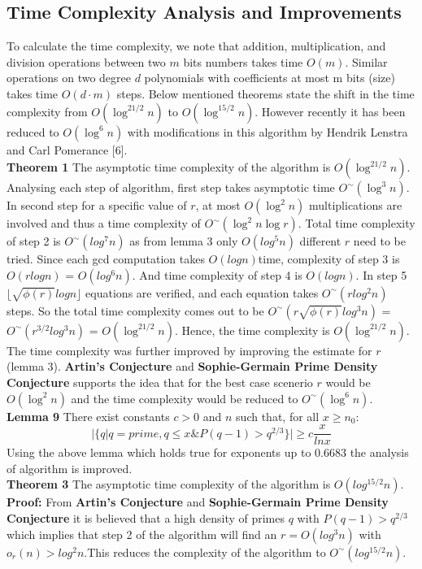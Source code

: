 \documentclass[10pt]{article}
\begin{document}
\subsection*{Time Complexity Analysis and Improvements}
To calculate the time complexity, we note that addition, multiplication, and division operations between two $m$ bits numbers takes time $O(m)$. Similar operations on two degree $d$ polynomials with coefficients at most m bits (size) takes time $O(d·m)$ steps. Below mentioned theorems state the shift in the time complexity from $O(\log^{21/2}n)$ to $O(\log^{15/2}n)$. However recently it has been reduced to $O(\log^6 n)$ with  modifications in this algorithm by Hendrik Lenstra and Carl Pomerance [6].\\
\textbf{Theorem 1} The asymptotic time complexity of the algorithm is $O(\log^{21/2} n)$.\\
Analysing each step of algorithm, first step takes asymptotic time $O^\sim(\log^3 n)$. In second step for a specific value of $r$, at most $O(\log^2 n)$ multiplications are involved and thus a time complexity of $O^{\sim}(\log^2 n \log r)$. Total time complexity of step 2 is $O^{\sim}(log^7 n)$ as from lemma 3 only $O(log^5 n)$ different $r$ need to be tried. Since each gcd computation takes $O(log n)$time, complexity of step 3 is $O(r log n)$ = $O(log^6 n)$. And time complexity of step 4 is $O(log n)$. In step 5 $\lfloor \sqrt{\phi(r)} log n \rfloor$ equations are verified, and each equation takes $O^{\sim}(r log^{2} n)$ steps. So the total time complexity comes out to be $O^{\sim}(r \sqrt{\phi(r)} log^3 n)$ = $O^{\sim}(r^{3/2} log^3 n)$ = $O(\log^{21/2} n)$. Hence, the time complexity is $O(\log^{21/2} n)$.\\
The time complexity was further improved by improving the estimate for $r$ (lemma 3). \textbf{Artin’s Conjecture} and \textbf{Sophie-Germain Prime Density Conjecture} supports the idea that for the best case scenerio $r$ would be $O(\log^2 n)$ and the time complexity would be reduced to $O^{\sim}(\log^6 n)$.\\\textbf{Lemma 9} There exist constants $c > 0$ and $n$ such that, for all $x \geq n_0:$\\
\[|\{ q | q = prime, q \leq x \& P(q-1) > q^{2/ 3} \}| \geq c\frac{x}{ln x}\]
Using the above lemma which holds true for exponents up to 0.6683 the analysis of algorithm is improved.\\
\textbf{Theorem 3} The asymptotic time complexity of the algorithm is $O(log^{15/2} n)$.\\
\textbf{Proof:} From \textbf{Artin’s Conjecture} and \textbf{Sophie-Germain Prime Density Conjecture} it is believed that a high density of primes $q$ with $P(q-1) > q^{2/3}$ which implies that step 2 of the algorithm will find an $r = O(log^3 n)$ with $o_r(n) > log^2 n$.This reduces the complexity of the algorithm to $O^{\sim}(log^{15/2} n)$.
\end{document}
